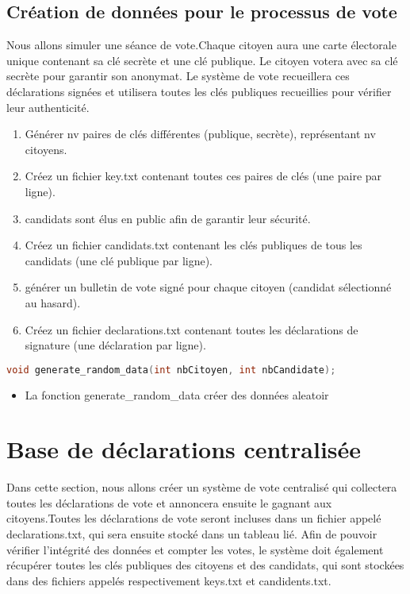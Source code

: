 \documentclass{article}
\begin{document}
\subsection{Création de données pour le processus de vote}
Nous allons simuler une séance de vote.Chaque citoyen aura une carte électorale unique contenant sa clé secrète et une clé publique.  Le citoyen votera avec sa clé secrète pour garantir son anonymat. Le système de vote recueillera ces déclarations signées et utilisera toutes les clés publiques recueillies pour vérifier leur authenticité.
\begin{enumerate}
\item Générer nv paires de clés différentes (publique, secrète), représentant nv citoyens.
\item Créez un fichier key.txt contenant toutes ces paires de clés (une paire par ligne).
\item candidats sont élus en public afin de garantir leur sécurité.
\item Créez un fichier candidats.txt contenant les clés publiques de tous les candidats (une clé publique par ligne).
\item générer un bulletin de vote signé pour chaque citoyen (candidat sélectionné au hasard).
\item Créez un fichier declarations.txt contenant toutes les déclarations de signature (une déclaration par ligne).
\end{enumerate}
\begin{lstlisting}[language={C}]
void generate_random_data(int nbCitoyen, int nbCandidate);
\end{lstlisting}
\begin{itemize}
    \item La fonction generate\_random\_data créer des données aleatoir
\end{itemize}
\section{Base de déclarations centralisée}
Dans cette section, nous allons créer un système de vote centralisé qui collectera toutes les déclarations de vote et annoncera ensuite le gagnant aux citoyens.Toutes les déclarations de vote seront incluses dans un fichier appelé declarations.txt, qui sera ensuite stocké dans un tableau lié. Afin de pouvoir vérifier l'intégrité des données et compter les votes, le système doit également récupérer toutes les clés publiques des citoyens et des candidats, qui sont stockées dans des fichiers appelés respectivement keys.txt et candidents.txt.\newline
\end{document}

